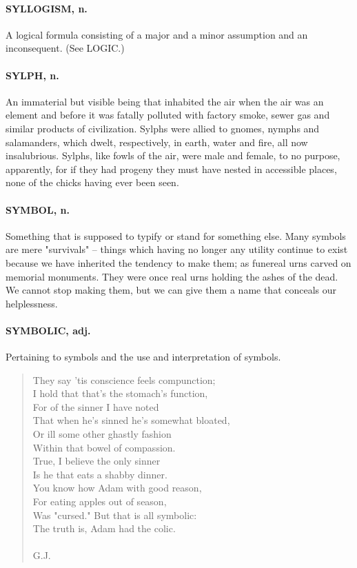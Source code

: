 \documentclass[11pt]{article}
\begin{document}
\paragraph{SYLLOGISM, n.}  A logical formula consisting of a major and a minor
assumption and an inconsequent.  (See LOGIC.)

\paragraph{SYLPH, n.}  An immaterial but visible being that inhabited the air when
the air was an element and before it was fatally polluted with factory
smoke, sewer gas and similar products of civilization.  Sylphs were
allied to gnomes, nymphs and salamanders, which dwelt, respectively,
in earth, water and fire, all now insalubrious.  Sylphs, like fowls of
the air, were male and female, to no purpose, apparently, for if they
had progeny they must have nested in accessible places, none of the
chicks having ever been seen.

\paragraph{SYMBOL, n.}  Something that is supposed to typify or stand for
something else.  Many symbols are mere "survivals" -- things which
having no longer any utility continue to exist because we have
inherited the tendency to make them; as funereal urns carved on
memorial monuments.  They were once real urns holding the ashes of the
dead.  We cannot stop making them, but we can give them a name that
conceals our helplessness.

\paragraph{SYMBOLIC, adj.}  Pertaining to symbols and the use and interpretation
of symbols.

\begin{quote}   They say 'tis conscience feels compunction; \\
  I hold that that's the stomach's function, \\
  For of the sinner I have noted \\
  That when he's sinned he's somewhat bloated, \\
  Or ill some other ghastly fashion \\
  Within that bowel of compassion. \\
  True, I believe the only sinner \\
  Is he that eats a shabby dinner. \\
  You know how Adam with good reason, \\
  For eating apples out of season, \\
  Was "cursed."  But that is all symbolic: \\
  The truth is, Adam had the colic. \\
 \\
G.J. \end{quote}
\end{document}
